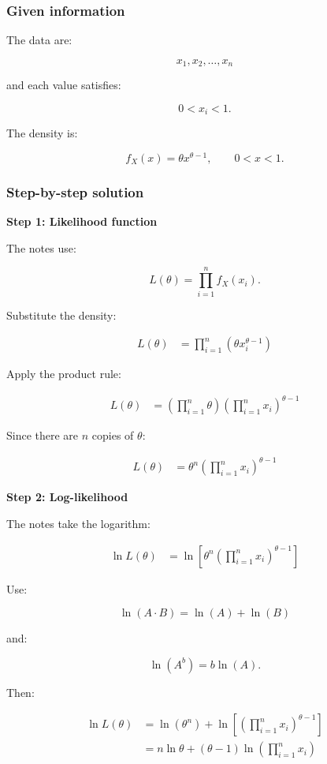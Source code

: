 \documentclass[10pt]{article}
\begin{document}
\subsubsection*{Given information}
The data are:

\[
x_1,x_2,\ldots,x_n
\]

and each value satisfies:

\[
0<x_i<1.
\]

The density is:

\[
f_X(x)=\theta x^{\theta-1},
\qquad 0<x<1.
\]

\subsubsection*{Step-by-step solution}

\textbf{Step 1: Likelihood function}

The notes use:

\[
L(\theta)
=
\prod_{i=1}^n f_X(x_i).
\]

Substitute the density:

\begin{align*}
L(\theta)
&=
\prod_{i=1}^n
\left(\theta x_i^{\theta-1}\right)
\end{align*}

Apply the product rule:

\begin{align*}
L(\theta)
&=
\left(\prod_{i=1}^n \theta\right)
\left(\prod_{i=1}^n x_i\right)^{\theta-1}
\end{align*}

Since there are $n$ copies of $\theta$:

\begin{align*}
L(\theta)
&=
\theta^n
\left(\prod_{i=1}^n x_i\right)^{\theta-1}
\end{align*}

\textbf{Step 2: Log-likelihood}

The notes take the logarithm:

\begin{align*}
\ln L(\theta)
&=
\ln\left[
\theta^n
\left(\prod_{i=1}^n x_i\right)^{\theta-1}
\right]
\end{align*}

Use:

\[
\ln(A\cdot B)=\ln(A)+\ln(B)
\]

and:

\[
\ln(A^b)=b\ln(A).
\]

Then:

\begin{align*}
\ln L(\theta)
&=
\ln(\theta^n)
+\ln\left[
\left(\prod_{i=1}^n x_i\right)^{\theta-1}
\right] \\[2mm]
&=
n\ln\theta
+(\theta-1)
\ln\left(\prod_{i=1}^n x_i\right)
\end{align*}
\end{document}
